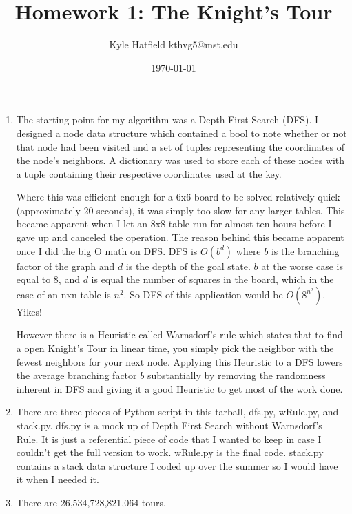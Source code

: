 \documentclass{article}
\title{Homework 1: The Knight's Tour}
\author{Kyle Hatfield kthvg5@mst.edu}
\date{\today}
\begin{document}
	\maketitle
	\begin{enumerate}
		\item The starting point for my algorithm was a Depth First Search (DFS). I designed a node data structure which contained a bool to note whether or not that node had been visited and a set of tuples representing the coordinates of the node's neighbors. A dictionary was used to store each of these nodes with a tuple containing their respective coordinates used at the key.
		
		Where this was efficient enough for a 6x6 board to be solved relatively quick (approximately 20 seconds), it was simply too slow for any larger tables. This became apparent when I let an 8x8 table run for almost ten hours before I gave up and canceled the operation. The reason behind this became apparent once I did the big O math on DFS. DFS is $O(b^d)$ where $b$ is the branching factor of the graph and $d$ is the depth of the goal state. $b$ at the worse case is equal to 8, and $d$ is equal the number of squares in the board, which in the case of an nxn table is $n^2$. So DFS of this application would be $O(8^{n^2})$. Yikes!
		
		However there is a Heuristic called Warnsdorf's rule which states that to find a open Knight's Tour in linear time, you simply pick the neighbor with the fewest neighbors for your next node. Applying this Heuristic to a DFS lowers the average branching factor $b$ substantially by removing the randomness inherent in DFS and giving it a good Heuristic to get most of the work done.
		
		\item There are three pieces of Python script in this tarball, dfs.py, wRule.py, and stack.py. dfs.py is a mock up of Depth First Search without Warnsdorf's Rule. It is just a referential piece of code that I wanted to keep in case I couldn't get the full version to work. wRule.py is the final code. stack.py contains a stack data structure I coded up over the summer so I would have it when I needed it.
		
		\item There are 26,534,728,821,064 tours.
	\end{enumerate}
\end{document}
